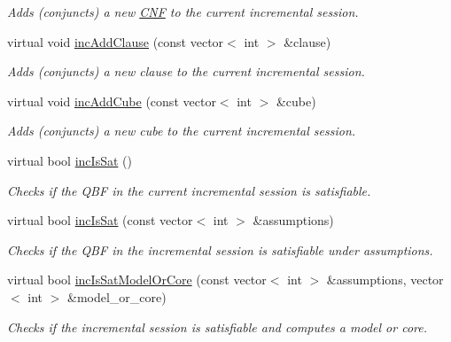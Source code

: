 \begin{DoxyCompactItemize}
\begin{DoxyCompactList}\small\item\em Adds (conjuncts) a new \hyperlink{classCNF}{C\-N\-F} to the current incremental session. \end{DoxyCompactList}\item 
virtual void \hyperlink{classDepQBFApiInc_a02a9240f178470cd4c31b6584827aa1e}{inc\-Add\-Clause} (const vector$<$ int $>$ \&clause)
\begin{DoxyCompactList}\small\item\em Adds (conjuncts) a new clause to the current incremental session. \end{DoxyCompactList}\item 
virtual void \hyperlink{classDepQBFApiInc_af2844ae0ef747e2c86c840547f220e8c}{inc\-Add\-Cube} (const vector$<$ int $>$ \&cube)
\begin{DoxyCompactList}\small\item\em Adds (conjuncts) a new cube to the current incremental session. \end{DoxyCompactList}\item 
virtual bool \hyperlink{classDepQBFApiInc_ad2050c686056005bb7a670d4789c2c46}{inc\-Is\-Sat} ()
\begin{DoxyCompactList}\small\item\em Checks if the Q\-B\-F in the current incremental session is satisfiable. \end{DoxyCompactList}\item 
virtual bool \hyperlink{classDepQBFApiInc_ae7eb8958812c2749700d73814a0e5be9}{inc\-Is\-Sat} (const vector$<$ int $>$ \&assumptions)
\begin{DoxyCompactList}\small\item\em Checks if the Q\-B\-F in the incremental session is satisfiable under assumptions. \end{DoxyCompactList}\item 
virtual bool \hyperlink{classDepQBFApiInc_aa359b68463922dd0b1d20bd0e187f0f3}{inc\-Is\-Sat\-Model\-Or\-Core} (const vector$<$ int $>$ \&assumptions, vector$<$ int $>$ \&model\-\_\-or\-\_\-core)
\begin{DoxyCompactList}\small\item\em Checks if the incremental session is satisfiable and computes a model or core. \end{DoxyCompactList}\end{DoxyCompactItemize}
